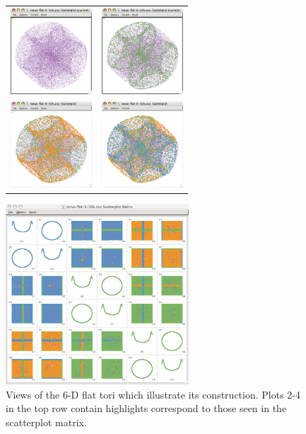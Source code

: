 \begin{figure}[ht]
  \centering
    \begin{tabular}{c c}
    \includegraphics[width=1.2in]{fig/torus-flat-6-0.pdf} &
      \includegraphics[width=1.2in]{fig/torus-flat-6-1.pdf} \\
    \includegraphics[width=1.2in]{fig/torus-flat-6-2.pdf} &
      \includegraphics[width=1.2in]{fig/torus-flat-6-3.pdf}
    \end{tabular}
  \centerline{
    \includegraphics[width=2.7in]{fig/torus-flat-6-matrix.pdf}
  }
  \caption{Views of the 6-D flat tori which illustrate its
    construction. Plots 2-4 in the top row contain highlights correspond
    to those seen in the scatterplot matrix.}
  \label{flat2}
\end{figure}

